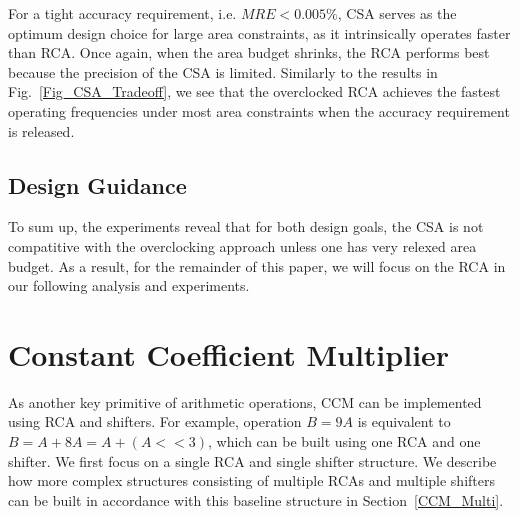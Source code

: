 \documentclass[prodmode,acmtrets]{acmsmall} %
\begin{document}
For a tight accuracy requirement, i.e. $MRE<0.005\%$, CSA serves as the optimum design choice for large area constraints, as it intrinsically operates faster than RCA. Once again, when the area budget shrinks, the RCA performs best because the precision of the CSA is limited. Similarly to the results in Fig.~\ref{Fig_CSA_Tradeoff}, we see that the overclocked RCA achieves the fastest operating frequencies under most area constraints when the accuracy requirement is released.

\subsection{Design Guidance}
To sum up, the experiments reveal that for both design goals, the CSA is not compatitive with the overclocking approach unless one has very relexed area budget. As a result, for the remainder of this paper, we will focus on the RCA in our following analysis and experiments.


\section{Constant Coefficient Multiplier}\label{section_CCM}

As another key primitive of arithmetic operations, CCM can be implemented using RCA and shifters. For example, operation $B=9A$ is equivalent to $B=A+8A=A+(A<<3)$, which can be built using one RCA and one shifter. We first focus on a single RCA and single shifter structure. We describe how more complex structures consisting of multiple RCAs and multiple shifters can be built in accordance with this baseline structure in Section~\ref{CCM_Multi}.
\end{document}
